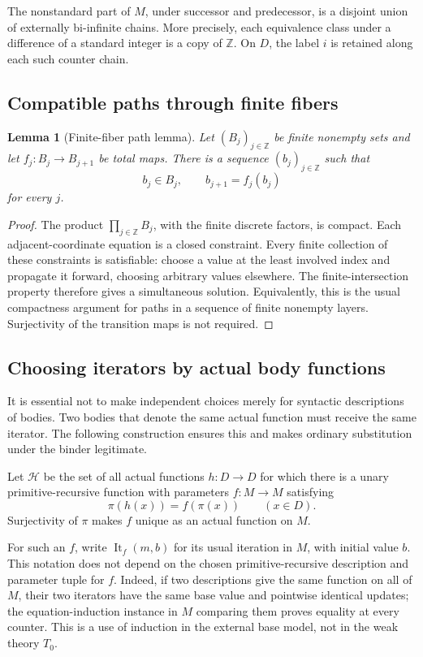 \documentclass[11pt]{article}
\newtheorem{lemma}[theorem]{Lemma}
\theoremstyle{definition}
\begin{document}
The nonstandard part of \(M\), under successor and predecessor, is a disjoint union of externally bi-infinite chains. More precisely, each equivalence class under a difference of a standard integer is a copy of \(\mathbb Z\). On \(D\), the label \(i\) is retained along each such counter chain.

\subsection{Compatible paths through finite fibers}

\begin{lemma}[Finite-fiber path lemma]\label{zi:path}
Let \((B_j)_{j\in\mathbb Z}\) be finite nonempty sets and let
\(f_j:B_j\to B_{j+1}\) be total maps. There is a sequence
\((b_j)_{j\in\mathbb Z}\) such that
\[
b_j\in B_j,\qquad b_{j+1}=f_j(b_j)
\]
for every \(j\).
\end{lemma}
\begin{proof}
The product \(\prod_{j\in\mathbb Z}B_j\), with the finite discrete factors, is compact. Each adjacent-coordinate equation is a closed constraint. Every finite collection of these constraints is satisfiable: choose a value at the least involved index and propagate it forward, choosing arbitrary values elsewhere. The finite-intersection property therefore gives a simultaneous solution. Equivalently, this is the usual compactness argument for paths in a sequence of finite nonempty layers. Surjectivity of the transition maps is not required.
\end{proof}

\subsection{Choosing iterators by actual body functions}

It is essential not to make independent choices merely for syntactic descriptions of bodies. Two bodies that denote the same actual function must receive the same iterator. The following construction ensures this and makes ordinary substitution under the binder legitimate.

Let \(\mathscr H\) be the set of all actual functions \(h:D\to D\) for which there is a unary primitive-recursive function with parameters \(f:M\to M\) satisfying
\[
\pi(h(x))=f(\pi(x))\qquad(x\in D).
\tag{Projection}\label{zi:projection}
\]
Surjectivity of \(\pi\) makes \(f\) unique as an actual function on \(M\).

For such an \(f\), write \(\operatorname{It}_f(m,b)\) for its usual iteration in \(M\), with initial value \(b\). This notation does not depend on the chosen primitive-recursive description and parameter tuple for \(f\). Indeed, if two descriptions give the same function on all of \(M\), their two iterators have the same base value and pointwise identical updates; the equation-induction instance in \(M\) comparing them proves equality at every counter. This is a use of induction in the external base model, not in the weak theory \(T_0\).
\end{document}
